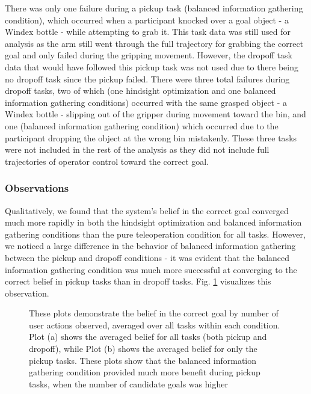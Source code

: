 \documentclass[conference]{IEEEtran}
\begin{document}
There was only one failure during a pickup task (balanced information gathering condition), which occurred when a participant knocked over a goal object - a Windex bottle - while attempting to grab it. This task data was still used for analysis as the arm still went through the full trajectory for grabbing the correct goal and only failed during the gripping movement. However, the dropoff task data that would have followed this pickup task was not used due to there being no dropoff task since the pickup failed. There were three total failures during dropoff tasks, two of which (one hindsight optimization and one balanced information gathering conditions) occurred with the same grasped object - a Windex bottle - slipping out of the gripper during movement toward the bin, and one (balanced information gathering condition) which occurred due to the participant dropping the object at the wrong bin mistakenly. These three tasks were not included in the rest of the analysis as they did not include full trajectories of operator control toward the correct goal.

\subsubsection{Observations}
Qualitatively, we found that the system's belief in the correct goal converged much more rapidly in both the hindsight optimization and balanced information gathering conditions than the pure teleoperation condition for all tasks. However, we noticed a large difference in the behavior of balanced information gathering between the pickup and dropoff conditions - it was evident that the balanced information gathering condition was much more successful at converging to the correct belief in pickup tasks than in dropoff tasks. Fig. \ref{belief_graphs} visualizes this observation.

\begin{figure}
\caption{These plots demonstrate the belief in the correct goal by number of user actions observed, averaged over all tasks within each condition. Plot (a) shows the averaged belief for all tasks (both pickup and dropoff), while Plot (b) shows the averaged belief for only the pickup tasks. These plots show that the balanced information gathering condition provided much more benefit during pickup tasks, when the number of candidate goals was higher}
\label{belief_graphs}
\end{figure}
\end{document}

